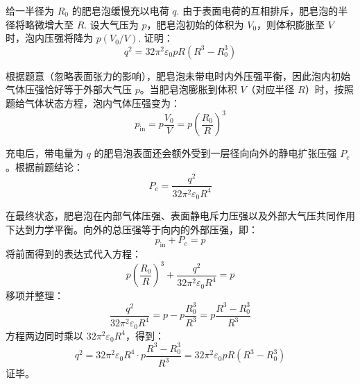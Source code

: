 \begin{exercise}\label{ex:15.14}
给一半径为 $R_0$ 的肥皂泡缓慢充以电荷 $q$. 由于表面电荷的互相排斥，肥皂泡的半径将略微增大至 $R$. 设大气压为 $p$，肥皂泡初始的体积为 $V_0$，则体积膨胀至 $V$ 时，泡内压强将降为 $p(V_0/V)$. 证明：
$$ q^2 = 32\pi^2\varepsilon_0 pR(R^3 - R_0^3) $$
\end{exercise}
\begin{solution}
根据题意（忽略表面张力的影响），肥皂泡未带电时内外压强平衡，因此泡内初始气体压强恰好等于外部大气压 $p$。当肥皂泡膨胀到体积 $V$（对应半径 $R$）时，按照题给气体状态方程，泡内气体压强变为：
$$ p_{\text{in}} = p \frac{V_0}{V} = p \left( \frac{R_0}{R} \right)^3 $$

充电后，带电量为 $q$ 的肥皂泡表面还会额外受到一层径向向外的静电扩张压强 $P_e$。根据前题结论：
$$ P_e = \frac{q^2}{32\pi^2\varepsilon_0 R^4} $$

在最终状态，肥皂泡在内部气体压强、表面静电斥力压强以及外部大气压共同作用下达到力学平衡。向外的总压强等于向内的外部压强，即：
$$ p_{\text{in}} + P_e = p $$
将前面得到的表达式代入方程：
$$ p \left( \frac{R_0}{R} \right)^3 + \frac{q^2}{32\pi^2\varepsilon_0 R^4} = p $$
移项并整理：
$$ \frac{q^2}{32\pi^2\varepsilon_0 R^4} = p - p \frac{R_0^3}{R^3} = p \frac{R^3 - R_0^3}{R^3} $$
方程两边同时乘以 $32\pi^2\varepsilon_0 R^4$，得到：
$$ q^2 = 32\pi^2\varepsilon_0 R^4 \cdot p \frac{R^3 - R_0^3}{R^3} = 32\pi^2\varepsilon_0 p R (R^3 - R_0^3) $$
证毕。
\end{solution}

